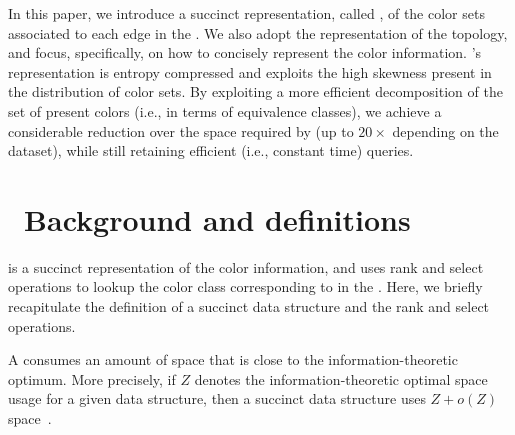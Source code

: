   In this paper, we introduce a succinct representation, called \rainbowfish, of the
  color sets associated to each edge in the \dbg. We also adopt the \boss
  representation of the \dbg topology, and focus, specifically, on how to
  concisely represent the color information. \rainbowfish's \cdbg representation is
  entropy compressed and exploits the high skewness present in the distribution
  of color sets. By exploiting a more efficient decomposition of the set of
  present colors (i.e., in terms of equivalence classes), we achieve a
  considerable reduction over the space required by \vari (up to $20\times$
  depending on the dataset), while still retaining efficient (i.e., constant
  time) queries.


\section{~Background and definitions}

\rainbowfish is a succinct representation of the color information, and uses rank and
select operations to lookup the color class corresponding to \kmers in the \dbg.
Here, we briefly recapitulate the definition of a succinct data structure and the
rank and select operations.

A  consumes an amount of space that is close to
the information-theoretic optimum. More precisely, if $Z$ denotes the
information-theoretic optimal space usage for a given data structure, then a succinct
data structure uses $Z + o(Z)$ space~\cite{Jacobson89}.

